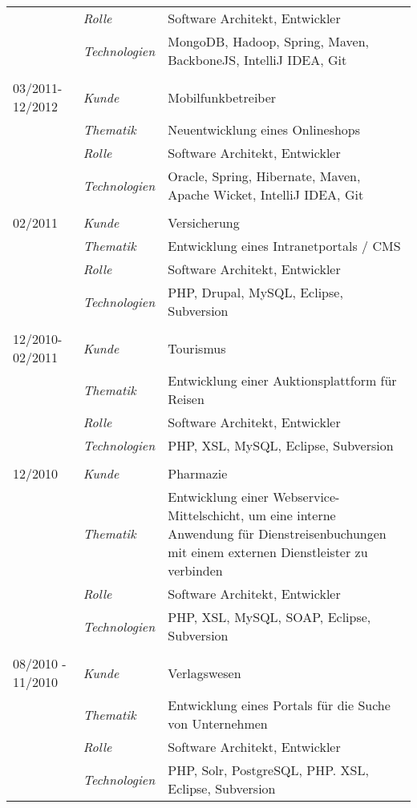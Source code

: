 \begin{longtable}{@{}>{}p{4cm}>{\itshape}p{2cm}>{}p{9cm}}
\nopagebreak		& Rolle 	    & Software Architekt, Entwickler\\
\nopagebreak		& Technologien	& MongoDB, Hadoop, Spring, Maven, BackboneJS, IntelliJ IDEA, Git\\
\\
03/2011-12/2012     & Kunde 	    & Mobilfunkbetreiber\\
\nopagebreak		& Thematik	    & Neuentwicklung eines Onlineshops \\
\nopagebreak		& Rolle 	    & Software Architekt, Entwickler\\
\nopagebreak		& Technologien	& Oracle, Spring, Hibernate, Maven, Apache Wicket, IntelliJ IDEA, Git\\
\\
02/2011             & Kunde 	    & Versicherung\\
\nopagebreak		& Thematik	    & Entwicklung eines Intranetportals / CMS\\
\nopagebreak		& Rolle 	    & Software Architekt, Entwickler\\
\nopagebreak		& Technologien	& PHP, Drupal, MySQL, Eclipse, Subversion\\
\\
12/2010-02/2011     & Kunde 	    & Tourismus\\
\nopagebreak		& Thematik	    & Entwicklung einer Auktionsplattform für Reisen\\
\nopagebreak		& Rolle 	    & Software Architekt, Entwickler\\
\nopagebreak		& Technologien	& PHP, XSL, MySQL, Eclipse, Subversion\\
\\
12/2010         	& Kunde 	    & Pharmazie\\
\nopagebreak		& Thematik	    & Entwicklung einer Webservice-Mittelschicht, um eine interne Anwendung für Dienstreisenbuchungen mit einem externen Dienstleister zu verbinden\\
\nopagebreak		& Rolle 	    & Software Architekt, Entwickler\\
\nopagebreak		& Technologien	& PHP, XSL, MySQL, SOAP, Eclipse, Subversion\\
\\
08/2010 - 11/2010	& Kunde 	    & Verlagswesen\\
\nopagebreak		& Thematik	    & Entwicklung eines Portals für die Suche von Unternehmen\\
\nopagebreak		& Rolle 	    & Software Architekt, Entwickler\\
\nopagebreak		& Technologien	& PHP, Solr, PostgreSQL, PHP. XSL, Eclipse, Subversion\\

\end{longtable}

